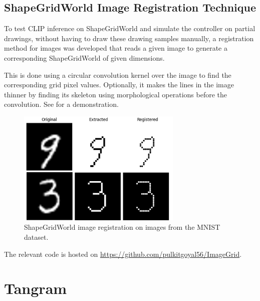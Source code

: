 \subsection{ShapeGridWorld Image Registration Technique}
\label{sec:sgw-registration}

To test CLIP inference on ShapeGridWorld and simulate the controller on partial drawings, without having to draw these drawing samples manually, a registration method for images was developed that reads a given image to generate a corresponding ShapeGridWorld of given dimensions.

This is done using a circular convolution kernel over the image to find the corresponding grid pixel values.
Optionally, it makes the lines in the image thinner by finding its skeleton using morphological operations before the convolution.
See  for a demonstration.

\begin{figure}[h]
    \centering
    \includegraphics[width=0.7\textwidth]{images/grid_registration.png}
    \caption{ShapeGridWorld image registration on images from the MNIST dataset.}
    \label{fig:sgw-registration}
\end{figure}

The relevant code is hosted on \url{https://github.com/pulkitgoyal56/ImageGrid}.

\newpage
\section{Tangram}
\label{sec:tangram-details}

